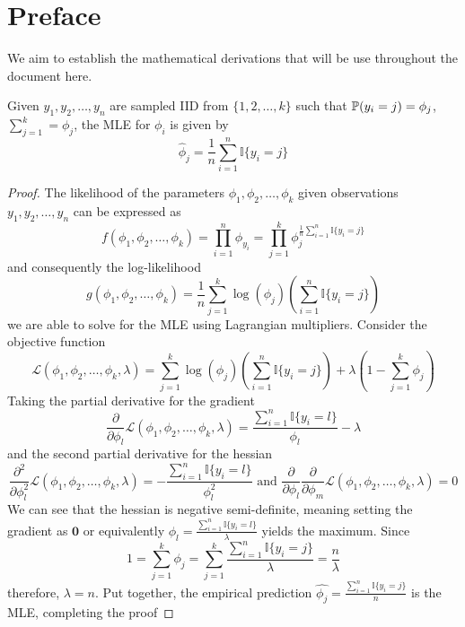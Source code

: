 \section*{Preface}
We aim to establish the mathematical derivations that will be use throughout the document here.
\begin{theorem}
    Given $y_1,y_2,\dots,y_n$ are sampled IID from $\{1,2,\dots,k\}$ such that $\mathbb{P}(y_i=j)=\phi_j$, $\sum_{j=1}^k=\phi_j$, the MLE for $\phi_i$ is given by
    \[
        \hat{\phi}_j = \frac{1}{n} \sum_{i=1}^n \mathbb{I}\{y_i=j\}
    \]
\end{theorem}
\begin{proof}
    The likelihood of the parameters $\phi_1,\phi_2,\dots,\phi_k$ given observations $y_1,y_2,\dots,y_n$ can be expressed as
    \[
    f(\phi_1,\phi_2,\dots,\phi_k) = \prod_{i=1}^n \phi_{y_i} = \prod_{j=1}^k \phi_{j} ^ {\frac{1}{n} \sum_{i=1}^n \mathbb{I}\{y_i=j\}}
    \]
    and consequently the log-likelihood
    \[
    g(\phi_1,\phi_2,\dots,\phi_k) = \frac{1}{n} \sum_{j=1}^k \log(\phi_{j}) \left(\sum_{i=1}^n \mathbb{I}\{y_i=j\}\right)
    \]
    we are able to solve for the MLE using Lagrangian multipliers. Consider the objective function 
    \[
    \mathcal{L}(\phi_1,\phi_2,\dots,\phi_k,\lambda) = \sum_{j=1}^k \log(\phi_{j}) \left(\sum_{i=1}^n \mathbb{I}\{y_i=j\}\right) + \lambda\left(1-\sum_{j=1}^k\phi_j\right)
    \]
    Taking the partial derivative for the gradient
    \[
    \frac{\partial}{\partial \phi_l} \mathcal{L}(\phi_1,\phi_2,\dots,\phi_k,\lambda) = \frac{\sum_{i=1}^n \mathbb{I}\{y_i=l\}}{\phi_l} - \lambda
    \]
    and the second partial derivative for the hessian
    \[
        \frac{\partial^2}{\partial \phi_l^2} \mathcal{L}(\phi_1,\phi_2,\dots,\phi_k,\lambda) = -\frac{\sum_{i=1}^n \mathbb{I}\{y_i=l\}}{\phi_l^2}
        \text{ and }
        \frac{\partial}{\partial \phi_l}\frac{\partial}{\partial \phi_m}\mathcal{L}(\phi_1,\phi_2,\dots,\phi_k,\lambda) = 0
    \]
    We can see that the hessian is negative semi-definite, meaning setting the gradient as $\mathbf{0}$ or equivalently $\phi_l=\frac{\sum_{i=1}^n \mathbb{I}\{y_i=l\}}{\lambda}$ yields the maximum. Since
    \[
        1 = \sum_{j=1}^k\phi_j = \sum_{j=1}^k \frac{\sum_{i=1}^n \mathbb{I}\{y_i=j\}}{\lambda} = \frac{n}{\lambda}
    \]
    therefore, $\lambda=n$. Put together, the empirical prediction $\hat{\phi_j} = \frac{\sum_{i=1}^n \mathbb{I}\{y_i=j\}}{n}$ is the MLE, completing the proof
\end{proof}

